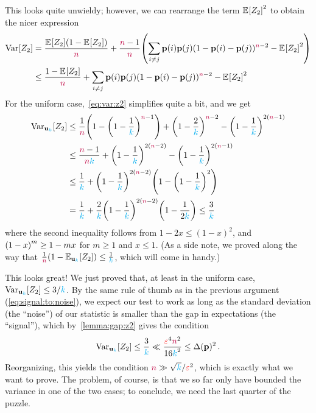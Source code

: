 This looks quite unwieldy; however, we can rearrange the term $\bEE{Z_2}^2$ to obtain the nicer expression
\begin{align}
\Var[Z_2] 
&= \frac{\bEE{Z_2}(1-\bEE{Z_2})}{\ns} + \frac{\ns-1}{\ns}\Paren{\sum_{i\neq j} \p(i)\p(j)(1-\p(i)-\p(j))^{\ns-2} - \bEE{Z_2}^2 } \notag\\
&\leq \frac{1-\bEE{Z_2}}{\ns} + \sum_{i\neq j} \p(i)\p(j)(1-\p(i)-\p(j))^{\ns-2} - \bEE{Z_2}^2 \label{eq:var:z2}
\end{align}
For the uniform case,~\cref{eq:var:z2} simplifies quite a bit, and we get
\begin{align}
\Var_{\uniform_{\ab}}[Z_2] 
&\leq \frac{1}{\ns} \Paren{ 1-\Paren{1-\frac{1}{\ab}}^{\ns-1} } + \Paren{1-\frac{2}{\ab}}^{\ns-2} - \Paren{1-\frac{1}{\ab}}^{2(\ns-1)} \notag\\
&\leq \frac{\ns-1}{\ns\ab} + \Paren{1-\frac{1}{\ab}}^{2(\ns-2)} - \Paren{1-\frac{1}{\ab}}^{2(\ns-1)} \notag\\
&\leq \frac{1}{\ab} + \Paren{1-\frac{1}{\ab}}^{2(\ns-2)} \Paren{ 1 - \Paren{1-\frac{1}{\ab}}^{2} } \notag\\
&= \frac{1}{\ab} + \frac{2}{\ab}\Paren{1-\frac{1}{\ab}}^{2(\ns-2)} \Paren{ 1-\frac{1}{2\ab} } \leq \frac{3}{\ab}
\label{eq:var:z2:unif}
\end{align}
where the second inequality follows from $1-2x \leq (1-x)^2$, and $\Paren{1-x}^{m} \geq 1-mx$ for $m\geq 1$ and $x \leq 1$. (As a side note, we proved along the way that $\frac{1}{\ns}\Paren{1-\bE{\uniform_{\ab}}{Z_2}} \leq \frac{1}{\ab}$, which will come in handy.)

This looks great! We just proved that, at least in the uniform case, $\operatorname{Var}_{\mathbf{u}_{{\textcolor{cyan}{k}}}}[Z_2] \leq 3/{\textcolor{cyan}{k}}$. By the same rule of thumb as in the previous argument (\cref{eq:signal:to:noise}), we expect our test to work as long as the standard deviation (the ``noise'') of our statistic is smaller than the gap in expectations (the ``signal''), which by~\cref{lemma:gap:z2} gives the condition
\[
   \operatorname{Var}_{\mathbf{u}_{{\textcolor{cyan}{k}}}}[Z_2] \leq \frac{3}{{\textcolor{cyan}{k}}} \ll \frac{\textcolor{red}{\varepsilon}^4{\textcolor{purple}{n}}^2}{16{\textcolor{cyan}{k}}^2} \leq \Delta(\mathbf{p})^2\,.
\]
Reorganizing, this yields the condition ${\textcolor{purple}{n}} \gg \sqrt{{\textcolor{cyan}{k}}}/\textcolor{red}{\varepsilon}^2$, which is exactly what we want to prove. The problem, of course, is that we so far only have bounded the variance in one of the two cases; to conclude, we need the last quarter of the puzzle.

